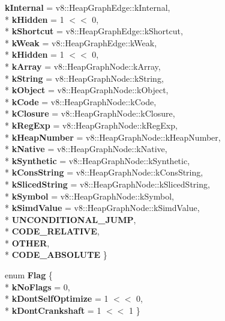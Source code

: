 \begin{DoxyCompactItemize}
{\bfseries k\+Internal} = v8\+:\+:Heap\+Graph\+Edge\+:\+:k\+Internal, 
\\*
{\bfseries k\+Hidden} = 1 $<$$<$ 0, 
\\*
{\bfseries k\+Shortcut} = v8\+:\+:Heap\+Graph\+Edge\+:\+:k\+Shortcut, 
\\*
{\bfseries k\+Weak} = v8\+:\+:Heap\+Graph\+Edge\+:\+:k\+Weak, 
\\*
{\bfseries k\+Hidden} = 1 $<$$<$ 0, 
\\*
{\bfseries k\+Array} = v8\+:\+:Heap\+Graph\+Node\+:\+:k\+Array, 
\\*
{\bfseries k\+String} = v8\+:\+:Heap\+Graph\+Node\+:\+:k\+String, 
\\*
{\bfseries k\+Object} = v8\+:\+:Heap\+Graph\+Node\+:\+:k\+Object, 
\\*
{\bfseries k\+Code} = v8\+:\+:Heap\+Graph\+Node\+:\+:k\+Code, 
\\*
{\bfseries k\+Closure} = v8\+:\+:Heap\+Graph\+Node\+:\+:k\+Closure, 
\\*
{\bfseries k\+Reg\+Exp} = v8\+:\+:Heap\+Graph\+Node\+:\+:k\+Reg\+Exp, 
\\*
{\bfseries k\+Heap\+Number} = v8\+:\+:Heap\+Graph\+Node\+:\+:k\+Heap\+Number, 
\\*
{\bfseries k\+Native} = v8\+:\+:Heap\+Graph\+Node\+:\+:k\+Native, 
\\*
{\bfseries k\+Synthetic} = v8\+:\+:Heap\+Graph\+Node\+:\+:k\+Synthetic, 
\\*
{\bfseries k\+Cons\+String} = v8\+:\+:Heap\+Graph\+Node\+:\+:k\+Cons\+String, 
\\*
{\bfseries k\+Sliced\+String} = v8\+:\+:Heap\+Graph\+Node\+:\+:k\+Sliced\+String, 
\\*
{\bfseries k\+Symbol} = v8\+:\+:Heap\+Graph\+Node\+:\+:k\+Symbol, 
\\*
{\bfseries k\+Simd\+Value} = v8\+:\+:Heap\+Graph\+Node\+:\+:k\+Simd\+Value, 
\\*
{\bfseries U\+N\+C\+O\+N\+D\+I\+T\+I\+O\+N\+A\+L\+\_\+\+J\+U\+MP}, 
\\*
{\bfseries C\+O\+D\+E\+\_\+\+R\+E\+L\+A\+T\+I\+VE}, 
\\*
{\bfseries O\+T\+H\+ER}, 
\\*
{\bfseries C\+O\+D\+E\+\_\+\+A\+B\+S\+O\+L\+U\+TE}
 \}\hypertarget{classv8_1_1internal_1_1_b_a_s_e___e_m_b_e_d_d_e_d_a86d4e2d8815ac6f9c09a8ff25971ffb9}{}\label{classv8_1_1internal_1_1_b_a_s_e___e_m_b_e_d_d_e_d_a86d4e2d8815ac6f9c09a8ff25971ffb9}

\item 
enum {\bfseries Flag} \{ \\*
{\bfseries k\+No\+Flags} = 0, 
\\*
{\bfseries k\+Dont\+Self\+Optimize} = 1 $<$$<$ 0, 
\\*
{\bfseries k\+Dont\+Crankshaft} = 1 $<$$<$ 1
 \}\hypertarget{classv8_1_1internal_1_1_b_a_s_e___e_m_b_e_d_d_e_d_a882cdcd607f3e36cbdb24277a4927715}{}\label{classv8_1_1internal_1_1_b_a_s_e___e_m_b_e_d_d_e_d_a882cdcd607f3e36cbdb24277a4927715}


\end{DoxyCompactItemize}
